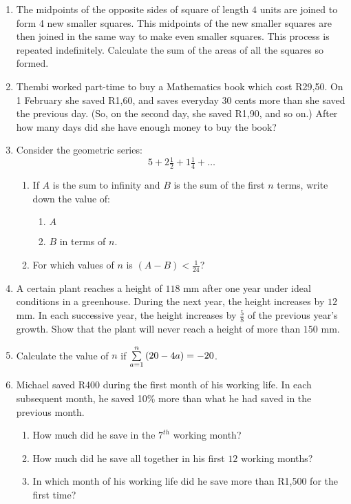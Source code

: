 \begin{enumerate}
\item The midpoints of the opposite sides of square of length $4$ units are joined to form 4 new smaller squares. This midpoints of the new smaller squares are then joined in the same way to make even smaller squares. This process is repeated indefinitely. Calculate the sum of the areas of all the squares so formed.

\item Thembi worked part-time to buy a Mathematics book which cost R29,50. On 1 February she saved R1,60, and saves everyday 30 cents more than she saved the previous day. (So, on the second day, she saved R1,90, and so on.) After how many days did she have enough money to buy the book?

\item Consider the geometric series: $$5 + 2\tfrac{1}{2} + 1\tfrac{1}{4} + \ldots $$
\begin{enumerate}
\item If $A$ is the sum to infinity and $B$ is the sum of the first $n$ terms, write down the value of:
\begin{enumerate}
\item $A$
\item $B$ in terms of $n$.
\end{enumerate}

\item For which values of $n$ is $(A - B) < \tfrac{1}{24}$?
\end{enumerate}

\item A certain plant reaches a height of $118$ mm after one year under ideal conditions in a greenhouse. During the next year, the height increases by $12$ mm. In each successive year, the height increases by $\tfrac{5}{8}$ of the previous year's growth. Show that the plant will never reach a height of more than $150$ mm.

\item Calculate the value of $n$ if $\sum_{a=1}^n \limits \, (20 - 4a) = -20$.

\item Michael saved R400 during the first month of his working life. In each subsequent month, he saved 10\% more than what he had saved in the previous month.
\begin{enumerate}
\item How much did he save in the $7^{th}$ working month?
\item How much did he save all together in his first $12$ working months?
\item In which month of his working life did he save more than R1,500 for the first time?
\end{enumerate}


\end{enumerate}
